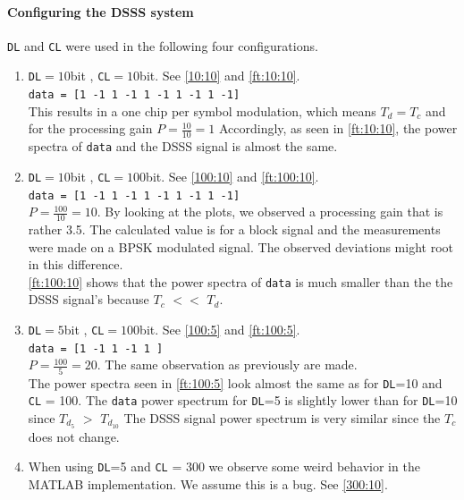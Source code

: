 \documentclass[12pt,a4paper]{article}
\begin{document}
\paragraph{Configuring the DSSS system} \label{config}
	\texttt{DL} and \texttt{CL} were used in the following four configurations.
	\begin{enumerate}
		\item \texttt{DL}$=10$bit , \texttt{CL}$=10$bit. 
			See \autoref{10:10} and \autoref{ft:10:10}. \\
			\texttt{data = [1 -1 1 -1 1 -1 1 -1 1 -1]}\\
			This results in a one chip per symbol modulation, which means $T_d = T_c$ and for the processing gain $P = \frac{10}{10} = 1$ 
			Accordingly, as seen in \autoref{ft:10:10}, the power spectra of \texttt{data} and the DSSS signal is almost the same.
			
		\item \texttt{DL}$=10$bit , \texttt{CL}$=100$bit. 
			See \autoref{100:10} and \autoref{ft:100:10}. \\
			\texttt{data = [1 -1 1 -1 1 -1 1 -1 1 -1]}\\
			$P = \frac{100}{10} = 10$. By looking at the plots, we observed a processing gain that is rather 3.5. The calculated value is for a block signal and the measurements were made on a BPSK modulated signal. The observed deviations might root in this difference.\\
			\autoref{ft:100:10} shows that the power spectra of \texttt{data} is much smaller than the the DSSS signal's because \texttt{$T_c$} $<<$ \texttt{$T_d$}.
		
		\item \texttt{DL}$=5$bit , \texttt{CL}$=100$bit. 
			See \autoref{100:5} and \autoref{ft:100:5}. \\
			\texttt{data = [1 -1 1 -1 1 ]}\\
			$P=\frac{100}{5} = 20$. The same observation as previously are made.\\
			The power spectra seen in \autoref{ft:100:5} look almost the same as for \texttt{DL}=10 and \texttt{CL} = 100. The \texttt{data} power spectrum for \texttt{DL}=5 is slightly lower than for \texttt{DL}=10 since \texttt{$T_{d_5}$} $>$ \texttt{$T_{d_{10}}$}
			The  DSSS signal power spectrum is very similar since the \texttt{$T_c$} does not change.
		
		\item When using \texttt{DL}=5 and \texttt{CL} = 300 we observe some weird behavior in the MATLAB implementation. We assume this is a bug. See \autoref{300:10}.
	\end{enumerate}
\end{document}
